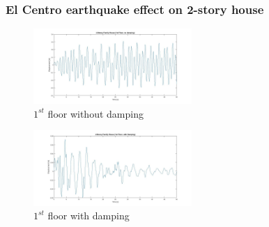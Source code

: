 \documentclass[xcolor=svgnames,9pt]{beamer}
\theoremstyle{remark}
\begin{document}
		\begin{frame}
			\frametitle{El Centro earthquake effect on 2-story house}
				\begin{figure}[h!]
   					\centering
   					\includegraphics[width=60mm]{FM1.jpg}
					\caption{$1^{st}$ floor without damping}
					\label{FM1}
  				\end{figure}
				\begin{figure}[h!]
   					\centering
   					\includegraphics[width=60mm]{FMD1.jpg}
					\caption{$1^{st}$ floor with damping}
					\label{FMD1}
  				\end{figure}
		\end{frame}
\end{document}
